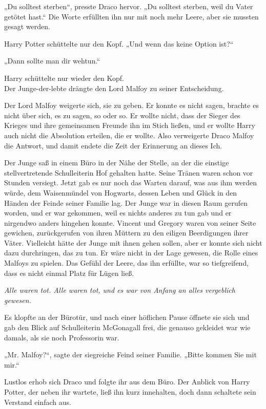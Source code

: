 {„Du solltest sterben“, presste Draco hervor. „Du solltest sterben, weil du Vater getötet hast.“ Die Worte erfüllten ihn nur mit noch mehr Leere, aber sie mussten gesagt werden.

Harry Potter schüttelte nur den Kopf. „Und wenn das keine Option ist?“

„Dann sollte man dir wehtun.“

Harry schüttelte nur wieder den Kopf.\\ Der Junge-der-lebte drängte den Lord Malfoy zu seiner Entscheidung.

Der Lord Malfoy weigerte sich, sie zu geben. Er konnte es nicht sagen, brachte es nicht über sich, es zu sagen, so oder so. Er wollte nicht, dass der Sieger des Krieges und ihre gemeinsamen Freunde ihn im Stich ließen, und er wollte Harry auch nicht die Absolution erteilen, die er wollte. Also verweigerte Draco Malfoy die Antwort, und damit endete die Zeit der Erinnerung an dieses Ich.

Der Junge saß in einem Büro in der Nähe der Stelle, an der die einstige stellvertretende Schulleiterin Hof gehalten hatte. Seine Tränen waren schon vor Stunden versiegt. Jetzt gab es nur noch das Warten darauf, was aus ihm werden würde, dem Waisenmündel von Hogwarts, dessen Leben und Glück in den Händen der Feinde seiner Familie lag. Der Junge war in diesen Raum gerufen worden, und er war gekommen, weil es nichts anderes zu tun gab und er nirgendwo anders hingehen konnte. Vincent und Gregory waren von seiner Seite gewichen, zurückgerufen von ihren Müttern zu den eiligen Beerdigungen ihrer Väter. Vielleicht hätte der Junge mit ihnen gehen sollen, aber er konnte sich nicht dazu durchringen, das zu tun. Er wäre nicht in der Lage gewesen, die Rolle eines Malfoys zu spielen. Das Gefühl der Leere, das ihn erfüllte, war so tiefgreifend, dass es nicht einmal Platz für Lügen ließ.

\emph{Alle waren tot. Alle waren tot, und es war von Anfang an alles vergeblich gewesen.}

Es klopfte an der Bürotür, und nach einer höflichen Pause öffnete sie sich und gab den Blick auf Schulleiterin McGonagall frei, die genauso gekleidet war wie damals, als sie noch Professorin war.

„Mr. Malfoy?“, sagte der siegreiche Feind seiner Familie. „Bitte kommen Sie mit mir.“

Lustlos erhob sich Draco und folgte ihr aus dem Büro. Der Anblick von Harry Potter, der neben ihr wartete, ließ ihn kurz innehalten, doch dann schaltete sein Verstand einfach aus.

}
